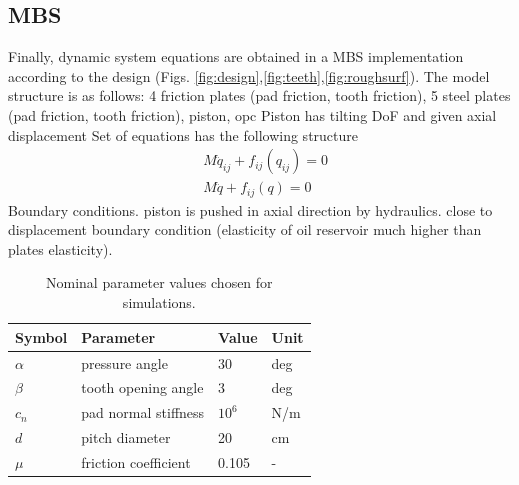 \documentclass[a4paper,fleqn]{cas-dc}
\begin{document}
\subsection{MBS}
Finally, dynamic system equations are obtained in a MBS implementation according to the design (Figs. \ref{fig:design},\ref{fig:teeth},\ref{fig:roughsurf}). The model structure is as follows: 
4 friction plates (pad friction, tooth friction),
5 steel plates (pad friction, tooth friction), 
piston, 
opc
Piston has tilting DoF and given axial displacement 
Set of equations has the following structure 
\begin{align}
	&{M}\ddot{{q}}_{ij} + f_{ij}(q_{ij}) = 0\\
	&{M}\ddot{{q}} + f_{ij}(q) = 0
\end{align}
Boundary conditions. piston is pushed in axial direction by hydraulics. close to displacement boundary condition (elasticity of oil reservoir much higher than plates elasticity).
\begin{table}[width=.9\linewidth,cols=4,pos=h]
	\caption{Nominal parameter values chosen for simulations.}\label{tab:parameters}
\begin{tabular*}{\tblwidth}{@{} LLLL@{} }
	\toprule
	Symbol & Parameter & Value & Unit\\
	\midrule
	$\alpha$ & pressure angle & 30 & deg \\
	$\beta$ & tooth opening angle & 3 & deg \\
	$c_n$ & pad normal stiffness & $10^6$ & N/m\\
	$d$ & pitch diameter & 20 & cm \\
	$\mu$ & friction coefficient & 0.105 & - \\
	\bottomrule
\end{tabular*}
\end{table}
\end{document}
